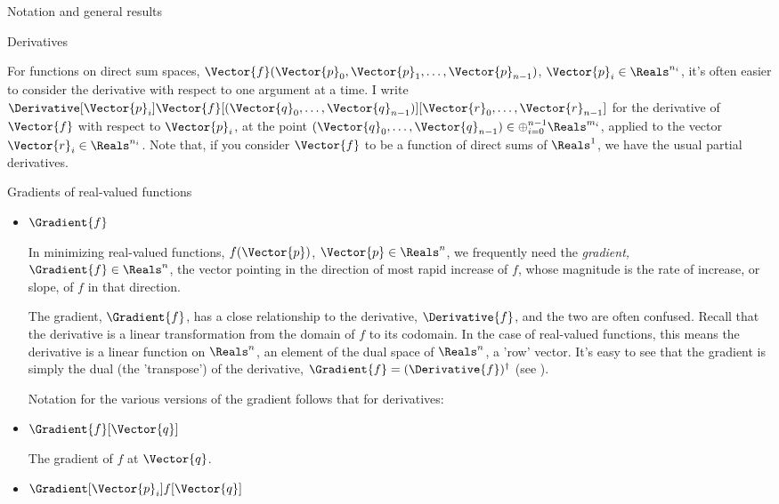 \begin{plSection}{Notation and general results}
\begin{plSection}{Derivatives}
\begin{itemize}
For functions on direct sum spaces,
$\Vector{f}(\Vector{p}_0,\Vector{p}_1,\ldots,
\Vector{p}_{n-1})$, 
$\Vector{p}_i \in \Reals^{n_i}$,
it's often easier to consider the derivative
with respect to one argument at a time.
I write 
$\Derivative[\Vector{p}_i]
{\Vector{f}}
[(\Vector{q}_0,\ldots,\Vector{q}_{n-1})]
[\Vector{r}_0,\ldots,\Vector{r}_{n-1}]$
for the derivative of $\Vector{f}$ 
with respect to $\Vector{p}_i$,
at the point 
$(\Vector{q}_0,\ldots,\Vector{q}_{n-1})
 \in \oplus_{i=0}^{n-1} \Reals^{m_i}$,
applied to the vector $\Vector{r}_i \in \Reals^{n_i}$.
Note that, if you consider $\Vector{f}$ to be a function
of direct sums of $\Reals^1$, we have the usual
partial derivatives.

\end{itemize}

\begin{plSection}{Gradients of real-valued functions}
\label{sec:gradients}

\begin{itemize}

\item $\Gradient{f}$

In minimizing real-valued functions, $f(\Vector{p})$, $\Vector{p} \in \Reals^n$,
we frequently need
the {\it gradient,} $\Gradient{f} \in \Reals^n$,
the vector pointing in the direction of most rapid increase of $f$,
whose magnitude is the rate of increase, or slope,
of $f$ in that direction.

The gradient, $\Gradient{f}$,
has a close relationship to the derivative, $\Derivative{f}$,
and the two are often confused.
Recall that the derivative is a linear transformation
from the domain of $f$ to its codomain.
In the case of real-valued functions,
this means the derivative is a linear function on $\Reals^n$,
an element of the dual space of $\Reals^n$, a 'row' vector.
It's easy to see that the gradient is simply the dual (the 'transpose')
of the derivative, $\Gradient{f} = (\Derivative{f})^{\dagger}$
(see ).

Notation for the various versions of the gradient
follows that for derivatives:

\item $\Gradient{f}[\Vector{q}]$

The gradient of $f$ at $\Vector{q}$.

\item $\Gradient[\Vector{p}_i]{f}[\Vector{q}]$


\end{itemize}
\end{plSection}
\end{plSection}
\end{plSection}

